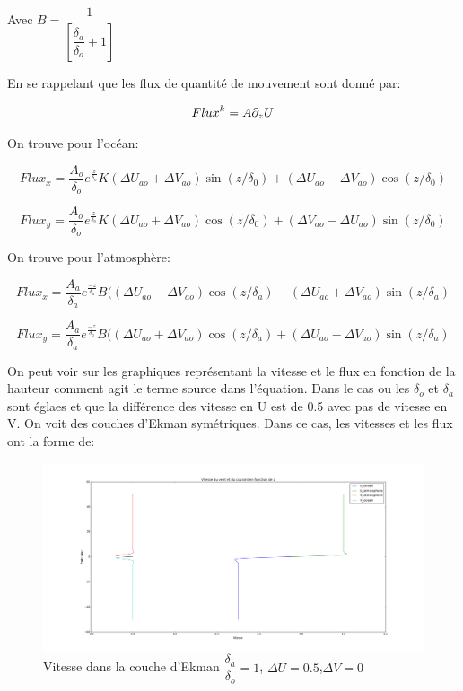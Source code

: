 \documentclass[11pt,a4paper,titlepage]{article}
\begin{document}
Avec $B = \dfrac{1}{ \left[\dfrac{\delta_a}{\delta_o}+1 \right]}$

En se rappelant que les flux de quantité de mouvement sont donné par: 

\begin{equation}
Flux^k = A \partial_z U 
\end{equation}

On trouve pour l'océan: 

\begin{equation}
Flux_x = \dfrac{A_o}{\delta_o} e^{\frac{z}{\delta_o}} K (\Delta U_{ao} +\Delta V_{ao}) \sin(z/\delta_0) + (\Delta U_{ao} - \Delta V_{ao}) \cos(z/\delta_0) 
\end{equation}

\begin{equation}
Flux_y = \dfrac{A_o}{\delta_o} e^{\frac{z}{\delta_o}} K (\Delta U_{ao} +\Delta V_{ao}) \cos(z/\delta_0) + (\Delta V_{ao} - \Delta U_{ao}) \sin(z/\delta_0) 
\end{equation}

\pagebreak

On trouve pour l'atmosphère: 

\begin{equation}
Flux_x = \dfrac{A_a}{\delta_a} e^{\frac{-z}{\delta_a}} B ((\Delta U_{ao} - \Delta V_{ao}  )\cos(z/\delta_a)  - (\Delta U_{ao} + \Delta V_{ao})  \sin(z/\delta_a)
\end{equation}

\begin{equation}
Flux_y = \dfrac{A_a}{\delta_a} e^{\frac{-z}{\delta_a}} B ((\Delta U_{ao} + \Delta V_{ao})  \cos(z/\delta_a)  + (\Delta U_{ao} - \Delta V_{ao})  \sin(z/\delta_a)
\end{equation}



On peut voir sur les graphiques représentant la vitesse et le flux en fonction de la hauteur comment agit le terme source dans l'équation.
Dans le cas ou les $\delta_o$ et $\delta_a$ sont églaes et que la différence des vitesse en U est de 0.5 avec pas de vitesse en V. On voit des couches d'Ekman symétriques. Dans ce cas, les vitesses et les flux ont la forme de:

\begin{figure}[H]
\includegraphics[width = \linewidth]{DELTAODELTAA1}
\caption{Vitesse dans la couche d'Ekman $\dfrac{\delta_a}{\delta_o}=1$, $\Delta U = 0.5$,$\Delta V = 0$ }
\end{figure}
\end{document}

